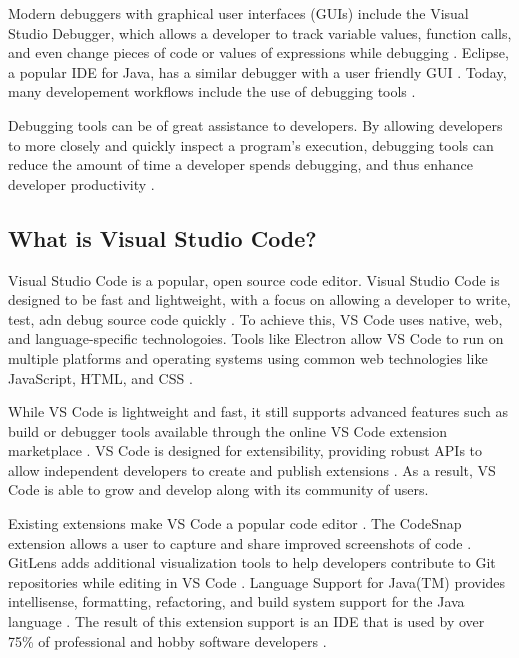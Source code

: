 \documentclass{article}
\begin{document}
Modern debuggers with graphical user interfaces (GUIs) include the Visual Studio Debugger, which allows a developer to track variable values, function calls, and even change pieces of code or values of expressions while debugging \cite{Microsoft_2022b}. Eclipse, a popular IDE for Java, has a similar debugger with a user friendly GUI \cite{Sinha_2017}. Today, many developement workflows include the use of debugging tools \cite{Matloff_Salzman_2008}.

Debugging tools can be of great assistance to developers. By allowing developers to more closely and quickly inspect a program's execution, debugging tools can reduce the amount of time a developer spends debugging, and thus enhance developer productivity \cite{ZhRaAmRuWo_2008}. 

\subsection{What is Visual Studio Code?}

Visual Studio Code is a popular, open source code editor. Visual Studio Code is designed to be fast and lightweight, with a focus on allowing a developer to write, test, adn debug source code quickly \cite{Microsoft_2023c}. To achieve this, VS Code uses native, web, and language-specific technologoies. Tools like Electron allow VS Code to run on multiple platforms and operating systems using common web technologies like JavaScript, HTML, and CSS \cite{Electron_2023}.

While VS Code is lightweight and fast, it still supports advanced features such as build or debugger tools available through the online VS Code extension marketplace \cite{Microsoft_2023b}. VS Code is designed for extensibility, providing robust APIs to allow independent developers to create and publish extensions \cite{Microsoft_2023d}. As a result, VS Code is able to grow and develop along with its community of users. 

Existing extensions make VS Code a popular code editor \cite{StackOverflow_2022}. The CodeSnap extension allows a user to capture and share improved screenshots of code \cite{adpyke_2021}. GitLens adds additional visualization tools to help developers contribute to Git repositories while editing in VS Code \cite{GitKraken_2023}. Language Support for Java(TM) provides intellisense, formatting, refactoring, and build system support for the Java language \cite{RedHat_2023}. The result of this extension support is an IDE that is used by over 75\% of professional and hobby software developers \cite{StackOverflow_2022}. 
\end{document}
